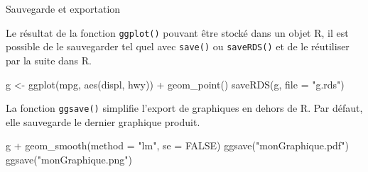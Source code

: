 \documentclass[12pt,ignorenonframetext,]{beamer}
\newenvironment{Shaded}{}{}
\newcommand{\KeywordTok}[1]{\textcolor[rgb]{0.00,0.00,1.00}{#1}}
\newcommand{\DataTypeTok}[1]{#1}
\newcommand{\StringTok}[1]{\textcolor[rgb]{0.00,0.50,0.50}{#1}}
\newcommand{\OtherTok}[1]{\textcolor[rgb]{1.00,0.25,0.00}{#1}}
\newcommand{\OperatorTok}[1]{#1}
\newcommand{\NormalTok}[1]{#1}
\renewenvironment{Shaded}{\begin{snugshade}}{\end{snugshade}}
\begin{document}
\begin{frame}[fragile]{Sauvegarde et exportation}

Le résultat de la fonction \texttt{ggplot()} pouvant être stocké dans un
objet R, il est possible de le sauvegarder tel quel avec \texttt{save()}
ou \texttt{saveRDS()} et de le réutiliser par la suite dans R.

\begin{Shaded}
\begin{Highlighting}[]
\NormalTok{g <-}\StringTok{ }\KeywordTok{ggplot}\NormalTok{(mpg, }\KeywordTok{aes}\NormalTok{(displ, hwy)) }\OperatorTok{+}\StringTok{ }\KeywordTok{geom_point}\NormalTok{()}
\KeywordTok{saveRDS}\NormalTok{(g, }\DataTypeTok{file =} \StringTok{"g.rds"}\NormalTok{)}
\end{Highlighting}
\end{Shaded}

\pause La fonction \texttt{ggsave()} simplifie l'export de graphiques en
dehors de R. Par défaut, elle sauvegarde le dernier graphique produit.

\begin{Shaded}
\begin{Highlighting}[]
\NormalTok{g }\OperatorTok{+}\StringTok{ }\KeywordTok{geom_smooth}\NormalTok{(}\DataTypeTok{method =} \StringTok{"lm"}\NormalTok{, }\DataTypeTok{se =} \OtherTok{FALSE}\NormalTok{)}
\KeywordTok{ggsave}\NormalTok{(}\StringTok{"monGraphique.pdf"}\NormalTok{)}
\KeywordTok{ggsave}\NormalTok{(}\StringTok{"monGraphique.png"}\NormalTok{)}
\end{Highlighting}
\end{Shaded}

\end{frame}
\end{document}
